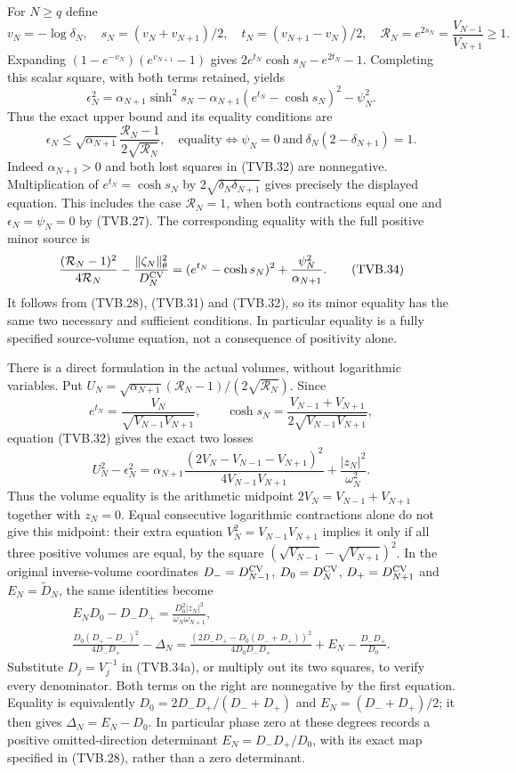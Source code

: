 For $N\ge q$ define
\[
 v_N=-\log\delta_N,\quad
 s_N=(v_N+v_{N+1})/2,\quad t_N=(v_{N+1}-v_N)/2,\quad
 \mathcal R_N=e^{2s_N}=\frac{V_{N-1}}{V_{N+1}}\ge1.
\]
Expanding $(1-e^{-v_N})(e^{v_{N+1}}-1)$ gives
$2e^{t_N}\cosh s_N-e^{2t_N}-1$.
Completing this scalar square, with both terms retained, yields
\[
 \boxed{\epsilon_N^2
 =\alpha_{N+1}\sinh^2s_N
 -\alpha_{N+1}(e^{t_N}-\cosh s_N)^2-\psi_N^2.}
 \tag{TVB.32}
\]
Thus the exact upper bound and its equality conditions are
\[
 \epsilon_N\le\sqrt{\alpha_{N+1}}
                 \frac{\mathcal R_N-1}{2\sqrt{\mathcal R_N}},
 \quad
 \text{equality}\iff
 \psi_N=0\ \text{and}\ \delta_N(2-\delta_{N+1})=1.
 \tag{TVB.33}
\]
Indeed $\alpha_{N+1}>0$ and both lost squares in (TVB.32) are
nonnegative. Multiplication of
$e^{t_N}=\cosh s_N$ by $2\sqrt{\delta_N\delta_{N+1}}$
gives precisely the displayed equation. This includes the case
$\mathcal R_N=1$, when both contractions equal one and
$\epsilon_N=\psi_N=0$ by (TVB.27).
The corresponding equality with the full positive minor source is
\[
 \frac{(\mathcal R_N-1)^2}{4\mathcal R_N}
 -\frac{\|\zeta_N\|_\theta^2}{D_N^{\rm CV}}
 =(e^{t_N}-\cosh s_N)^2+\frac{\psi_N^2}{\alpha_{N+1}}.
 \tag{TVB.34}
\]
It follows from (TVB.28), (TVB.31) and (TVB.32), so its
minor equality has the same two necessary and sufficient conditions.
In particular equality is a fully specified source-volume equation,
not a consequence of positivity alone.

There is a direct formulation in the actual volumes, without
logarithmic variables. Put $U_N=\sqrt{\alpha_{N+1}}
(\mathcal R_N-1)/(2\sqrt{\mathcal R_N})$. Since
\[
 e^{t_N}=\frac{V_N}{\sqrt{V_{N-1}V_{N+1}}},\qquad
 \cosh s_N=\frac{V_{N-1}+V_{N+1}}
                    {2\sqrt{V_{N-1}V_{N+1}}},
\]
equation (TVB.32) gives the exact two losses
\[
 U_N^2-\epsilon_N^2
 =\alpha_{N+1}
   \frac{(2V_N-V_{N-1}-V_{N+1})^2}{4V_{N-1}V_{N+1}}
  +\frac{|z_N|^2}{\omega_N^2}.
 \tag{TVB.34a}
\]
Thus the volume equality is the arithmetic midpoint
$2V_N=V_{N-1}+V_{N+1}$ together with $z_N=0$.
Equal consecutive logarithmic contractions alone do not give this
midpoint: their extra equation $V_N^2=V_{N-1}V_{N+1}$ implies it
only if all three positive volumes are equal, by the square
$(\sqrt{V_{N-1}}-\sqrt{V_{N+1}})^2$.
In the original inverse-volume coordinates
$D_-=D_{N-1}^{\rm CV}$, $D_0=D_N^{\rm CV}$,
$D_+=D_{N+1}^{\rm CV}$ and $E_N=\widetilde D_N$, the same
identities become
\[
 \begin{gathered}
 E_ND_0-D_-D_+
     =\frac{D_0^2|z_N|^2}{\omega_N\omega_{N+1}},\\
 \frac{D_0(D_+-D_-)^2}{4D_-D_+}-\Delta_N
 =\frac{(2D_-D_+-D_0(D_-+D_+))^2}{4D_0D_-D_+}
       +E_N-\frac{D_-D_+}{D_0}.
 \end{gathered}
 \tag{TVB.34b}
\]
Substitute $D_j=V_j^{-1}$ in (TVB.34a), or multiply out its two
squares, to verify every denominator. Both terms on the right
are nonnegative by the first equation. Equality is equivalently
$D_0=2D_-D_+/(D_-+D_+)$ and
$E_N=(D_-+D_+)/2$; it then gives $\Delta_N=E_N-D_0$.
In particular phase zero at these degrees records a positive
omitted-direction determinant $E_N=D_-D_+/D_0$, with its exact
map specified in (TVB.28), rather than a zero determinant.

